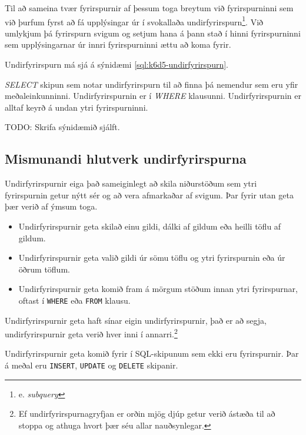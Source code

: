 Til að sameina tvær fyrirspurnir af þessum toga breytum við fyrirspurninni sem við þurfum fyrst að fá upplýsingar úr í svokallaða undirfyrirspurn\footnote{e. \emph{subquery}}. Við umlykjum þá fyrirspurn svigum og setjum hana á þann stað í hinni fyrirspurninni sem upplýsingarnar úr innri fyrirspurninni ættu að koma fyrir.

Undirfyrirspurn má sjá á sýnidæmi \ref{sql:k6d5-undirfyrirspurn}.
\begin{example}
\caption[Undirfyrirspurn]{\emph{SELECT} skipun sem notar undirfyrirspurn til að finna þá nemendur sem eru yfir meðaleinkunninni. Undirfyrirspurnin er í \emph{WHERE} klausunni. Undirfyrirspurnin er alltaf keyrð á undan ytri fyrirspurninni.}
\label{sql:k6d5-undirfyrirspurn}
\centering
{\color{red} TODO: Skrifa sýnidæmið sjálft.}
\end{example}
\subsection{Mismunandi hlutverk undirfyrirspurna}
Undirfyrirspurnir eiga það sameiginlegt að skila niðurstöðum sem ytri fyrirspurnin getur nýtt sér og að vera afmarkaðar af svigum. Þar fyrir utan geta þær verið af ýmsum toga.
\begin{itemize}
 \item Undirfyrirspurnir geta skilað einu gildi, dálki af gildum eða heilli töflu af gildum.
 \item Undirfyrirspurnir geta valið gildi úr sömu töflu og ytri fyrirspurnin eða úr öðrum töflum.
 \item Undirfyrirspurnir geta komið fram á mörgum stöðum innan ytri fyrirspurnar, oftast í \verb|WHERE| eða \verb|FROM| klausu.
\end{itemize}
Undirfyrirspurnir geta haft sínar eigin undirfyrirspurnir, það er að segja, undirfyrirspurnir geta verið hver inni í annarri.\footnote{Ef undirfyrirspurnagryfjan er orðin mjög djúp getur verið ástæða til að stoppa og athuga hvort þær séu allar nauðsynlegar.}

Undirfyrirspurnir geta komið fyrir í SQL-skipunum sem ekki eru fyrirspurnir. Þar á meðal eru \verb|INSERT|, \verb|UPDATE| og \verb|DELETE| skipanir.